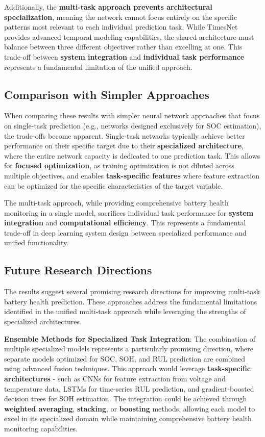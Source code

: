 Additionally, the \textbf{multi-task approach prevents architectural specialization}, meaning the network cannot focus entirely on the specific patterns most relevant to each individual prediction task. While TimesNet provides advanced temporal modeling capabilities, the shared architecture must balance between three different objectives rather than excelling at one. This trade-off between \textbf{system integration} and \textbf{individual task performance} represents a fundamental limitation of the unified approach.

\subsection{Comparison with Simpler Approaches}
\label{subsec:comparison_simpler}

When comparing these results with simpler neural network approaches that focus on single-task prediction (e.g., networks designed exclusively for SOC estimation), the trade-offs become apparent. Single-task networks typically achieve better performance on their specific target due to their \textbf{specialized architecture}, where the entire network capacity is dedicated to one prediction task. This allows for \textbf{focused optimization}, as training optimization is not diluted across multiple objectives, and enables \textbf{task-specific features} where feature extraction can be optimized for the specific characteristics of the target variable.

The multi-task approach, while providing comprehensive battery health monitoring in a single model, sacrifices individual task performance for \textbf{system integration} and \textbf{computational efficiency}. This represents a fundamental trade-off in deep learning system design between specialized performance and unified functionality.

\subsection{Future Research Directions}
\label{subsec:future_directions}

The results suggest several promising research directions for improving multi-task battery health prediction. These approaches address the fundamental limitations identified in the unified multi-task approach while leveraging the strengths of specialized architectures.

\textbf{Ensemble Methods for Specialized Task Integration}: The combination of multiple specialized models represents a particularly promising direction, where separate models optimized for SOC, SOH, and RUL prediction are combined using advanced fusion techniques. This approach would leverage \textbf{task-specific architectures} - such as CNNs for feature extraction from voltage and temperature data, LSTMs for time-series RUL prediction, and gradient-boosted decision trees for SOH estimation. The integration could be achieved through \textbf{weighted averaging}, \textbf{stacking}, or \textbf{boosting} methods, allowing each model to excel in its specialized domain while maintaining comprehensive battery health monitoring capabilities.

